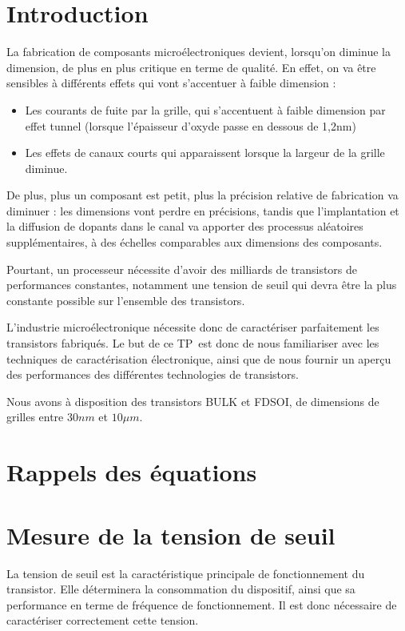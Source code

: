 \documentclass[a4paper,11pt]{report}
\begin{document}


\chapter*{Introduction}
La fabrication de composants microélectroniques devient, lorsqu'on diminue la dimension, de plus en plus critique en terme de qualité. En effet, on va être sensibles à différents effets qui vont s'accentuer à faible dimension :
\begin{itemize}
    \item Les courants de fuite par la grille, qui s'accentuent à faible dimension par effet tunnel (lorsque l'épaisseur d'oxyde passe en dessous de 1,2nm)
    \item Les effets de canaux courts qui apparaissent lorsque la largeur de la grille diminue.
\end{itemize}

De plus, plus un composant est petit, plus la précision relative de fabrication va diminuer : les dimensions vont perdre en précisions, tandis que l'implantation et la diffusion de dopants dans le canal va apporter des processus aléatoires supplémentaires, à des échelles comparables aux dimensions des composants.

Pourtant, un processeur nécessite d'avoir des milliards de transistors de performances constantes, notamment une tension de seuil qui devra être la plus constante possible sur l'ensemble des transistors.

L'industrie microélectronique nécessite donc de caractériser parfaitement les transistors fabriqués. Le but de ce TP est donc de nous familiariser avec les techniques de caractérisation électronique, ainsi que de nous fournir un aperçu des performances des différentes technologies de transistors.

Nous avons à disposition des transistors BULK et FDSOI, de dimensions de grilles entre $30nm$ et $10\mu m$.


\chapter{Rappels des équations}

\chapter{Mesure de la tension de seuil}
La tension de seuil est la caractéristique principale de fonctionnement du transistor. Elle déterminera la consommation du dispositif, ainsi que sa performance en terme de fréquence de fonctionnement. Il est donc nécessaire de caractériser correctement cette tension.
\end{document}
